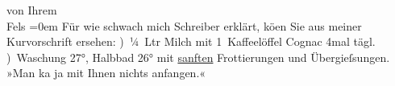 \begin{ledgroupsized}[t]{13cm}
               von\pend
           \pstart
           Ihrem{\\[\baselineskip]}\spacefill\mbox{Fels}\pend
           \leftskip=0em{}\pstart
           \noindent{}Für wie schwach mich Schreiber erklärt,
                     kö{\geminationn}en Sie aus meiner Kurvorschrift ersehen:\pend
           ) ¼ Ltr Milch mit 1 Kaffeelöffel Cognac 4mal tägl.\pend
           ) Waschung 27°, Halbbad 26° mit \uline{sanften}
                  Frottierungen und Übergieſsungen. »Man ka{\geminationn} ja mit
                  Ihnen nichts anfangen.«\pend
           
         
         \endnumbering{}\end{ledgroupsized}  \newcommand{\dateiname}{L00176}\newcommand{\titel}{Friedrich M. Fels an Arthur Schnitzler, 1[6]. 2. 1893}\newcommand{\editorInnen}{Martin Anton Müller und Gerd-Hermann Susen}
      